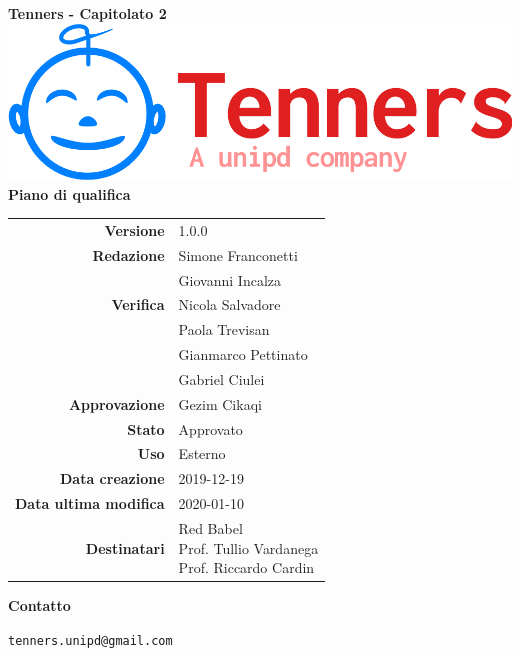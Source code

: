 \begin{titlepage}
	\begin{center}
		\large \textbf{Tenners - Capitolato 2}
		\vfill
		\includegraphics[scale = 0.3]{./res/img/logo.png}\\
		\vfill
		\Huge \textbf{Piano di qualifica}

        \vfill
        \large

        \begin{tabular}{r|l}
                        \textbf{Versione} & 1.0.0 \\
                        \textbf{Redazione} &
                        Simone Franconetti \\&
                        Giovanni Incalza \\
                        \textbf{Verifica} &
                        Nicola Salvadore \\&
                        Paola Trevisan \\&
												Gianmarco Pettinato \\&
												Gabriel Ciulei \\
                        \textbf{Approvazione} & Gezim Cikaqi \\
                        \textbf{Stato} & Approvato \\
                        \textbf{Uso} &  Esterno\\
                        \textbf{Data creazione} &  2019-12-19\\
                        \textbf{Data ultima modifica} &  2020-01-10\\
                        \textbf{Destinatari} & \parbox[t]{5cm}{Red Babel\\Prof. Tullio Vardanega\\Prof. Riccardo Cardin}
                \end{tabular}
                \vfill
                \normalsize
                \vfill
                \textbf{Contatto}

                \texttt{tenners.unipd@gmail.com}

	\end{center}
\end{titlepage}

